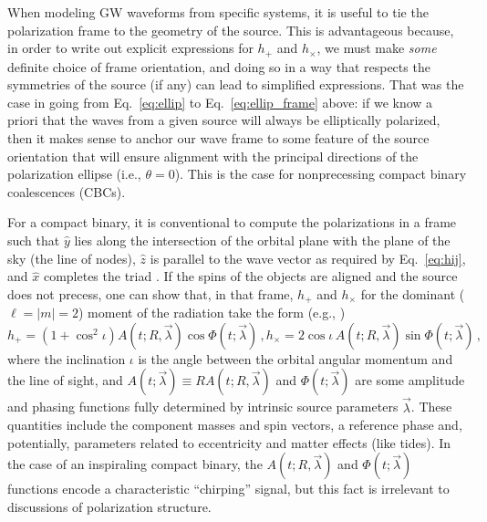 \documentclass[aps,prd,twocolumn,superscriptaddress,preprintnumbers,floatfix,nofootinbib]{revtex4-2}
\newcommand{\beq}{\begin{equation}}
\newcommand{\eeq}{\end{equation}}
\newcommand*{\eq}[1]{Eq.~\eqref{eq:#1}}
\begin{document}
When modeling GW waveforms from specific systems, it is useful to tie the polarization frame to the geometry of the source.
This is advantageous because, in order to write out explicit expressions for $h_+$ and $h_\times$, we must make \emph{some} definite choice of frame orientation, and doing so in a way that respects the symmetries of the source (if any) can lead to simplified expressions.
That was the case in going from Eq.~\eqref{eq:ellip} to Eq.~\eqref{eq:ellip_frame} above: if we know a priori that the waves from a given source will always be elliptically polarized, then it makes sense to anchor our wave frame to some feature of the source orientation that will ensure alignment with the principal directions of the polarization ellipse (i.e., $\theta=0$).
This is the case for nonprecessing compact binary coalescences (CBCs).

For a compact binary, it is conventional to compute the polarizations in a frame such that $\hat{y}$ lies along the intersection of the orbital plane with the plane of the sky (the line of nodes), $\hat{z}$ is parallel to the wave vector as required by \eq{hij}, and $\hat{x}$ completes the triad \cite{LALSuite:source}.
If the spins of the objects are aligned and the source does not precess, one can show that, in that frame, $h_+$ and $h_\times$ for the dominant ($\ell=|m|=2$) moment of the radiation take the form (e.g., \cite{Poisson2014})
\begin{subequations} \label{eq:cbc}
\beq
h_+ = \left(1 + \cos^2 \iota\right) A(t; R, \vec{\lambda}) \cos \Phi(t; \vec{\lambda}) \, , 
\label{eq:cbc_p} 
\eeq
\beq
h_\times = 2 \cos \iota\, A(t; R, \vec{\lambda}) \sin \Phi(t; \vec{\lambda})\, ,
\label{eq:cbc_c}
\eeq
\end{subequations}
where the inclination $\iota$ is the angle between the orbital angular momentum and the line of sight, and $A(t; \vec{\lambda}) \equiv R  A(t; R, \vec{\lambda})$ and $\Phi(t; \vec{\lambda})$ are some amplitude and phasing functions fully determined by intrinsic source parameters $\vec{\lambda}$.
These quantities include the component masses and spin vectors, a reference phase and, potentially, parameters related to eccentricity and matter effects (like tides).
In the case of an inspiraling compact binary, the $A(t; R, \vec{\lambda})$ and $\Phi(t; \vec{\lambda})$ functions encode a characteristic ``chirping'' signal, but this fact is irrelevant to discussions of polarization structure.
\end{document}

